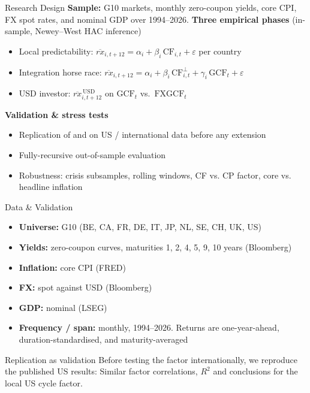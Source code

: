\documentclass[10pt]{beamer}
\newcommand{\CF}{\mathrm{CF}}
\newcommand{\GCF}{\mathrm{GCF}}
\newcommand{\FXGCF}{\mathrm{FXGCF}}
\newcommand{\rxbar}{\overline{rx}}
\begin{document}
\begin{frame}{Research Design}
  \textbf{Sample:} G10 markets, monthly zero-coupon yields, core CPI, FX spot
  rates, and nominal GDP over 1994--2026.
  \vfill
  \textbf{Three empirical phases} (in-sample, Newey--West HAC inference)
  \begin{itemize}
    \item[\textbf{I}] Local predictability:
      $\rxbar_{i,t+12}=\alpha_i+\beta_i\,\CF_{i,t}+\varepsilon$ per country
    \item[\textbf{II}] Integration horse race:
      $\rxbar_{i,t+12}=\alpha_i+\beta_i\,\CF^{\perp}_{i,t}
        +\gamma_i\,\GCF_{t}+\varepsilon$
    \item[\textbf{III}] USD investor:
      $\rxbar^{\,\mathrm{USD}}_{i,t+12}$ on $\GCF_{t}$ vs.\ $\FXGCF_{t}$
  \end{itemize}
  \vfill
  \textbf{Validation \& stress tests}
  \begin{itemize}
    \item Replication of \citet{cieslak2015} and \citet{dahlquist2013} on US /
      international data before any extension
    \item Fully-recursive out-of-sample evaluation
      \citep[Campbell--Thompson $R^{2}_{\mathrm{oos}}$,][]{campbellthompson2008}
    \item Robustness: crisis subsamples, rolling windows, CF vs. CP factor,
      core vs. headline inflation
  \end{itemize}
\end{frame}

\begin{frame}{Data \& Validation}
  \begin{itemize}
    \item \textbf{Universe:} G10 (BE, CA, FR, DE, IT, JP, NL, SE, CH, UK, US)
    \item \textbf{Yields:} zero-coupon curves, maturities 1, 2, 4, 5, 9, 10
      years (Bloomberg)
    \item \textbf{Inflation:} core CPI (FRED)
    \item \textbf{FX:}
      spot against USD (Bloomberg)
    \item \textbf{GDP:} nominal (LSEG)
    \item \textbf{Frequency / span:} monthly, 1994--2026. Returns are
      one-year-ahead, duration-standardised, and maturity-averaged
  \end{itemize}
  \vfill
  \begin{block}{Replication as validation}
    Before testing the factor internationally, we reproduce the published US results: Similar factor correlations, $R^2$ and conclusions for the local US cycle factor.
  \end{block}
\end{frame}
\end{document}

